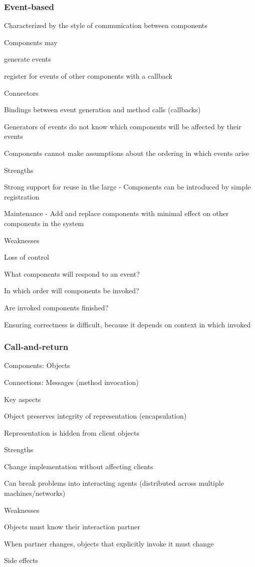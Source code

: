 \documentclass[10pt]{article}
\begin{document}
\subsubsection{Event-based}
\enumstart
	\item Characterized by the style of communication between components
	\item Components may
	\enumstart
		\item generate events
		\item register for events of other components with a callback
	\enumend
	\item Connectors
	\enumstart
		\item Bindings between event generation and method calls (callbacks)
	\enumend
	\item Generators of events do not know  which  components will be affected by their events
	\item Components cannot make assumptions about the ordering in which events arise
	\item Strengths
	\enumstart
		\item Strong support for reuse in the large - Components can be introduced by simple registration
		\item Maintenance - Add and replace components with minimal effect on other components in the system
	\enumend
	\item Weaknesses
	\enumstart
		\item Loss of control
		\enumstart
			 \item What components will respond to an event?
			 \item In which order will components be invoked?
			 \item Are invoked components finished?
		\enumend
		\item Ensuring correctness is difficult, because it depends on context in which invoked
	\enumend
\enumend

\subsubsection{Call-and-return}
\enumstart
	\item Components: Objects
	\item Connections: Messages (method invocation)
	\item Key aspects
	\enumstart
		\item Object preserves integrity of representation (encapsulation)
		\item Representation is hidden from client objects
	\enumend
	\item Strengths
	\enumstart
		\item Change implementation without affecting clients
		\item Can break problems into interacting agents (distributed across multiple machines/networks)
	\enumend
	\item Weaknesses
	\enumstart
		\item Objects must know their interaction partner
		\item When partner changes, objects that explicitly invoke it must change
		\item Side effects
	\enumend
\enumend
\end{document}
